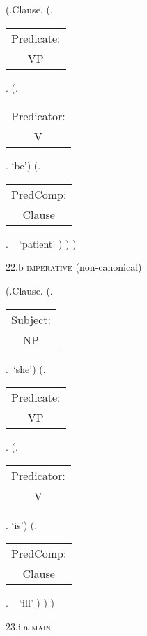 \documentclass[12pt,letterpaper]{article}
\begin{document}
\begin{figure}
	\begin{center}
		\begin{parsetree}
			(.Clause.
			(.\begin{tabular}{c}Predicate:\\VP\end{tabular}.
			(.\begin{tabular}{c}Predicator:\\V\end{tabular}. `be')
			(.\begin{tabular}{c}PredComp:\\Clause\end{tabular}. ~  `patient' )
			)
			)
			
			\hfill \break\hfill \break
		\end{parsetree}
		22.b \textsc{imperative} (non-canonical)
	\end{center}
\end{figure}

\begin{figure}
	\begin{center}
		\begin{parsetree}
			(.Clause.
			(.\begin{tabular}{c}Subject:\\NP\end{tabular}.~`she')
			(.\begin{tabular}{c}Predicate:\\VP\end{tabular}.
			(.\begin{tabular}{c}Predicator:\\V\end{tabular}. `is')
			(.\begin{tabular}{c}PredComp:\\Clause\end{tabular}. ~  `ill' )
			)
			)
			
			\hfill \break\hfill \break
		\end{parsetree}
		23.i.a \textsc{main}
	\end{center}
\end{figure}
\end{document}
